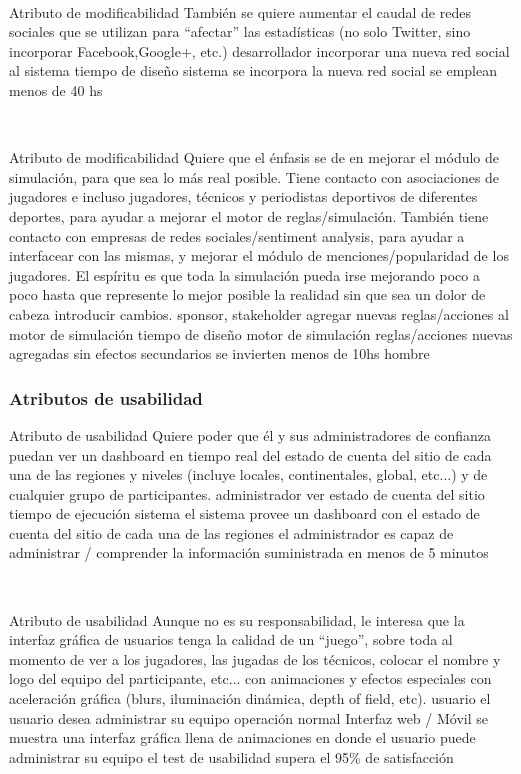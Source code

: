 ~

\escenario
{Atributo de modificabilidad}
{También se quiere aumentar el caudal de redes sociales que se utilizan para “afectar” las estadísticas (no solo Twitter, sino incorporar Facebook,Google+, etc.)}
{desarrollador}
{incorporar una nueva red social al sistema}
{tiempo de diseño}
{sistema}
{se incorpora la nueva red social}
{se emplean menos de 40 hs}

~

\escenario
{Atributo de modificabilidad}
{Quiere que el énfasis se de en mejorar el módulo de simulación, para que sea lo más real
posible. Tiene contacto con asociaciones de jugadores e incluso jugadores, técnicos y
periodistas deportivos de diferentes deportes, para ayudar a mejorar el motor de
reglas/simulación. También tiene contacto con empresas de redes sociales/sentiment
analysis, para ayudar a interfacear con las mismas, y mejorar el módulo de
menciones/popularidad de los jugadores. El espíritu es que toda la simulación pueda irse
mejorando poco a poco hasta que represente lo mejor posible la realidad sin que sea un
dolor de cabeza introducir cambios.}
{sponsor, stakeholder}
{agregar nuevas reglas/acciones al motor de simulación}
{tiempo de diseño}
{motor de simulación}
{reglas/acciones nuevas agregadas sin efectos secundarios}
{se invierten menos de 10hs hombre}


\subsubsection{Atributos de usabilidad}

\escenario
{Atributo de usabilidad}
{Quiere poder que él y sus administradores de confianza puedan ver un dashboard en
tiempo real del estado de cuenta del sitio de cada una de las regiones y niveles (incluye locales, continentales, global, etc...) y de cualquier grupo de participantes.}	
{administrador}
{ver estado de cuenta del sitio}
{tiempo de ejecución}
{sistema}
{el sistema provee un dashboard con el estado de cuenta del sitio de cada una de las regiones}
{el administrador es capaz de administrar / comprender la información suministrada en menos de 5 minutos}

~

\escenario
{Atributo de usabilidad}
{Aunque no es su responsabilidad, le interesa que la interfaz gráfica de usuarios tenga la
calidad de un “juego”, sobre toda al momento de ver a los jugadores, las jugadas de los
técnicos, colocar el nombre y logo del equipo del participante, etc... con animaciones y
efectos especiales con aceleración gráfica (blurs, iluminación dinámica, depth of field, etc).}
{usuario}
{el usuario desea administrar su equipo}
{operación normal}
{Interfaz web / Móvil}
{se muestra una interfaz gráfica llena de animaciones en donde el usuario puede administrar su equipo }
{el test de usabilidad supera el 95\% de satisfacción}

